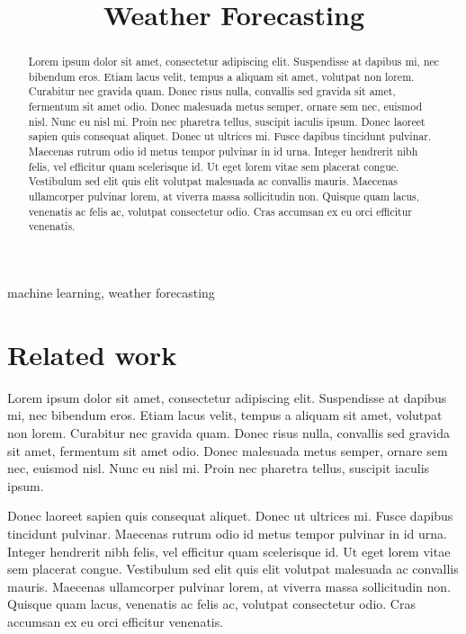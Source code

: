 



\title{Weather Forecasting}
\author{
    \and
    \and
    \and
}

\maketitle

\begin{abstract}
    Lorem ipsum dolor sit amet, consectetur adipiscing elit. Suspendisse at dapibus mi, nec bibendum eros. Etiam lacus velit, tempus a aliquam sit amet, volutpat non lorem. Curabitur nec gravida quam. Donec risus nulla, convallis sed gravida sit amet, fermentum sit amet odio. Donec malesuada metus semper, ornare sem nec, euismod nisl. Nunc eu nisl mi. Proin nec pharetra tellus, suscipit iaculis ipsum.
    Donec laoreet sapien quis consequat aliquet. Donec ut ultrices mi. Fusce dapibus tincidunt pulvinar. Maecenas rutrum odio id metus tempor pulvinar in id urna. Integer hendrerit nibh felis, vel efficitur quam scelerisque id. Ut eget lorem vitae sem placerat congue. Vestibulum sed elit quis elit volutpat malesuada ac convallis mauris. Maecenas ullamcorper pulvinar lorem, at viverra massa sollicitudin non. Quisque quam lacus, venenatis ac felis ac, volutpat consectetur odio. Cras accumsan ex eu orci efficitur venenatis.
\end{abstract}

\begin{IEEEkeywords}
machine learning, weather forecasting
\end{IEEEkeywords}




\section{Related work}
Lorem ipsum dolor sit amet, consectetur adipiscing elit. Suspendisse at dapibus mi, nec bibendum eros. Etiam lacus velit, tempus a aliquam sit amet, volutpat non lorem. Curabitur nec gravida quam. Donec risus nulla, convallis sed gravida sit amet, fermentum sit amet odio. Donec malesuada metus semper, ornare sem nec, euismod nisl. Nunc eu nisl mi. Proin nec pharetra tellus, suscipit iaculis ipsum.

Donec laoreet sapien quis consequat aliquet. Donec ut ultrices mi. Fusce dapibus tincidunt pulvinar. Maecenas rutrum odio id metus tempor pulvinar in id urna. Integer hendrerit nibh felis, vel efficitur quam scelerisque id. Ut eget lorem vitae sem placerat congue. Vestibulum sed elit quis elit volutpat malesuada ac convallis mauris. Maecenas ullamcorper pulvinar lorem, at viverra massa sollicitudin non. Quisque quam lacus, venenatis ac felis ac, volutpat consectetur odio. Cras accumsan ex eu orci efficitur venenatis.

